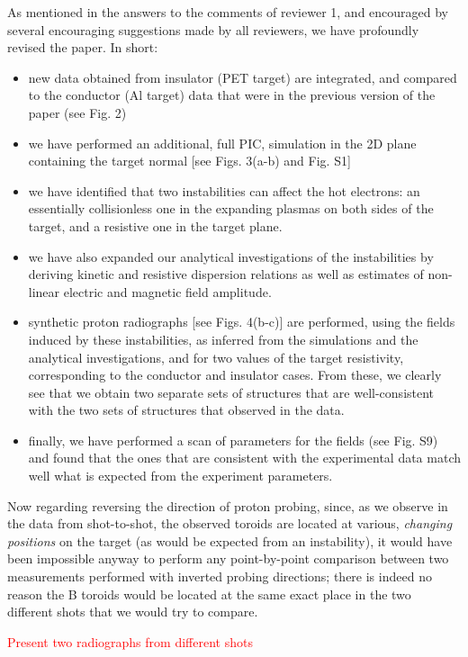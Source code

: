 \documentclass[aps,showpacs,superscriptaddress]{revtex4}%
\begin{document}
\begin{enumerate}
As mentioned in the answers to the comments of reviewer 1, and encouraged by several encouraging suggestions made by all reviewers, we have profoundly revised the paper. In short:
\begin{itemize}
    \item new data obtained from insulator (PET target) are integrated, and compared to the conductor (Al target) data that were in the previous version of the paper (see Fig. 2)
    \item we have performed an additional, full PIC, simulation in the 2D plane containing the target normal [see Figs. 3(a-b) and Fig. S1]
    \item we have identified that two instabilities can affect the hot electrons: an essentially  collisionless one in the expanding plasmas on both sides of the target, and a resistive one in the target plane. 
    \item we have also expanded our analytical investigations of the instabilities by deriving kinetic and resistive dispersion relations as well as  estimates of    non-linear electric and magnetic field amplitude.
    \item synthetic proton radiographs [see Figs. 4(b-c)] are performed, using the fields induced by these instabilities, as inferred from the simulations and the analytical investigations, and for two values of the target resistivity, corresponding to the conductor and insulator cases. From these, we clearly see that we obtain two separate sets of structures that are well-consistent with the two sets of structures that observed in the data. 
    \item finally, we have performed a scan of parameters for the fields (see Fig. S9) and found that the ones that are consistent with the experimental data match well what is expected from the experiment parameters. 
\end{itemize}

Now regarding  reversing the direction of proton probing,
since, as we observe in the data from shot-to-shot, the observed toroids are located at various, \emph{changing positions} on the target (as would be expected from an instability), it would have been impossible anyway to perform any point-by-point comparison between two measurements performed with inverted probing directions; there is indeed no reason the B toroids would be located at the same exact place in the two different shots that we would try to compare.

\textcolor{red}{Present two radiographs from different shots}


\end{enumerate}
\end{document}
